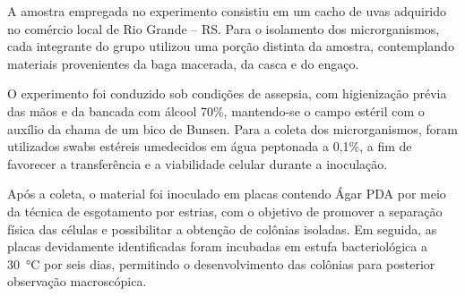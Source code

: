 A amostra empregada no experimento consistiu em um cacho de uvas adquirido no comércio local de Rio Grande -- RS. Para o isolamento dos microrganismos, cada integrante do grupo utilizou uma porção distinta da amostra, contemplando materiais provenientes da baga macerada, da casca e do engaço.

O experimento foi conduzido sob condições de assepsia, com higienização prévia das mãos e da bancada com álcool 70\%, mantendo-se o campo estéril com o auxílio da chama de um bico de Bunsen. Para a coleta dos microrganismos, foram utilizados swabs estéreis umedecidos em água peptonada a 0,1\%, a fim de favorecer a transferência e a viabilidade celular durante a inoculação.

Após a coleta, o material foi inoculado em placas contendo Ágar PDA por meio da técnica de esgotamento por estrias, com o objetivo de promover a separação física das células e possibilitar a obtenção de colônias isoladas. Em seguida, as placas devidamente identificadas foram incubadas em estufa bacteriológica a 30~°C por seis dias, permitindo o desenvolvimento das colônias para posterior observação macroscópica.